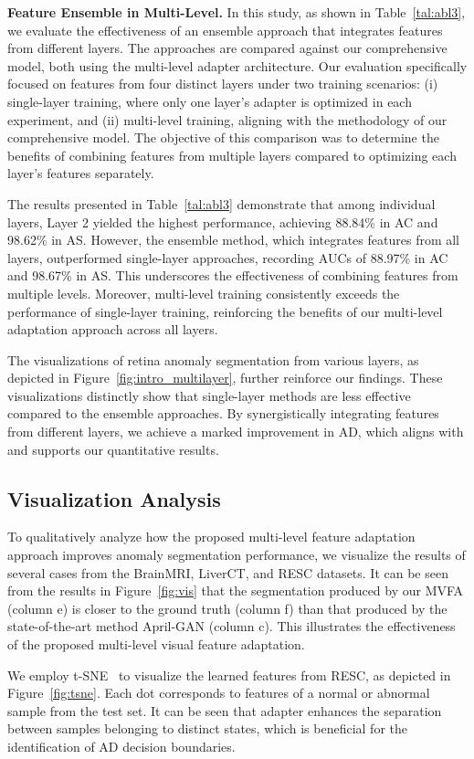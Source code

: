\noindent\textbf{Feature Ensemble in Multi-Level.} 
In this study, as shown in Table~\ref{tal:abl3}, we evaluate the effectiveness of an ensemble approach that integrates features from different layers. The approaches are compared against our comprehensive model, both using the multi-level adapter architecture. Our evaluation specifically focused on features from four distinct layers under two training scenarios: (i) single-layer training, where only one layer's adapter is optimized in each experiment, and (ii) multi-level training, aligning with the methodology of our comprehensive model. The objective of this comparison was to determine the benefits of combining features from multiple layers compared to optimizing each layer's features separately.

The results presented in Table~\ref{tal:abl3} demonstrate that among individual layers, Layer 2 yielded the highest performance, achieving 88.84\% in AC and 98.62\% in AS. However, the ensemble method, which integrates features from all layers, outperformed single-layer approaches, recording AUCs of 88.97\% in AC and 98.67\% in AS. This underscores the effectiveness of combining features from multiple levels. Moreover, multi-level training consistently exceeds the performance of single-layer training, reinforcing the benefits of our multi-level adaptation approach across all layers.

The visualizations of retina anomaly segmentation from various layers, as depicted in Figure~\ref{fig:intro_multilayer}, further reinforce our findings. These visualizations distinctly show that single-layer methods are less effective compared to the ensemble approaches. By synergistically integrating features from different layers, we achieve a marked improvement in AD, which aligns with and supports our quantitative results. 

\subsection{Visualization Analysis}

To qualitatively analyze how the proposed multi-level feature adaptation approach improves anomaly segmentation performance, we visualize the results of several cases from the BrainMRI, LiverCT, and RESC datasets. It can be seen from the results in Figure~\ref{fig:vis} that the segmentation produced by our MVFA (column e) is closer to the ground truth (column f) than that produced by the state-of-the-art method April-GAN (column c). This illustrates the effectiveness of the proposed multi-level visual feature adaptation.

We employ t-SNE~\cite{van2008visualizing} to visualize the learned features from RESC, as depicted in Figure~\ref{fig:tsne}. Each dot corresponds to features of a normal or abnormal sample from the test set. It can be seen that adapter enhances the separation between samples belonging to distinct states, which is beneficial for the identification of AD decision boundaries.